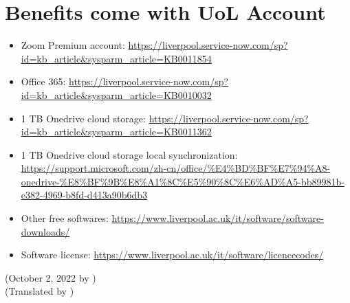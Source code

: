 \section{Benefits come with UoL Account}
\label{sec.fuli_liverpool}
\begin{itemize}
    \item Zoom Premium account: \url{https://liverpool.service-now.com/sp?id=kb_article&sysparm_article=KB0011854}
    \item Office 365: \url{https://liverpool.service-now.com/sp?id=kb_article&sysparm_article=KB0010032}
    \item 1 TB Onedrive cloud storage:  \url{https://liverpool.service-now.com/sp?id=kb_article&sysparm_article=KB0011362}
    \item 1 TB Onedrive cloud storage local synchronization: \url{https://support.microsoft.com/zh-cn/office/%E4%BD%BF%E7%94%A8-onedrive-%E8%BF%9B%E8%A1%8C%E5%90%8C%E6%AD%A5-bb89981b-e382-4969-b8fd-d413a90b6db3}
    \item Other free softwares: \url{https://www.liverpool.ac.uk/it/software/software-downloads/}
    \item Software license: \url{https://www.liverpool.ac.uk/it/software/licencecodes/}
\end{itemize}

\begin{flushright}
    (October 2, 2022 by \Wu) \\
    (Translated by \Shiyao)
    \end{flushright}